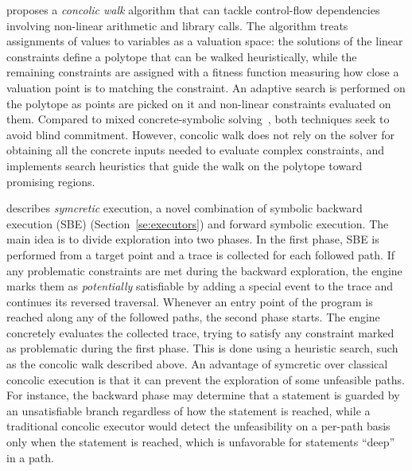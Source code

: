 \cite{DA-FSE14} proposes a {\em concolic walk} algorithm that can tackle control-flow dependencies involving non-linear arithmetic and library calls. The algorithm treats assignments of values to variables as a valuation space: the solutions of the linear constraints define a polytope that can be walked heuristically, while the remaining constraints are assigned with a fitness function measuring how close a valuation point is to matching the constraint. An adaptive search is performed on the polytope as points are picked on it and non-linear constraints evaluated on them. Compared to mixed concrete-symbolic solving~\cite{PRV-ISSTA11}, both techniques seek to avoid blind commitment. However, concolic walk does not rely on the solver for obtaining all the concrete inputs needed to evaluate complex constraints, and implements search heuristics that guide the walk on the polytope toward promising regions.


\cite{DA-ASE14} describes {\em symcretic} execution, a novel combination of symbolic backward execution (SBE) (Section~\ref{se:executors}) and forward symbolic execution. The main idea is to divide exploration into two phases. In the first phase, SBE is performed from a target point and a trace is collected for each followed path. If any problematic constraints are met during the backward exploration, the engine marks them as {\em potentially} satisfiable by adding a special event to the trace and continues its reversed traversal. Whenever an entry point of the program is reached along any of the followed paths, the second phase starts. The engine concretely evaluates the collected trace, trying to satisfy any constraint marked as problematic during the first phase. This is done using a heuristic search, such as the concolic walk described above. An advantage of symcretic over classical concolic execution is that it can prevent the exploration of some unfeasible paths. For instance, the backward phase may determine that a statement is guarded by an unsatisfiable branch regardless of how the statement is reached, while a traditional concolic executor would detect the unfeasibility on a per-path basis only when the statement is reached, which is unfavorable for statements ``deep'' in a path.

